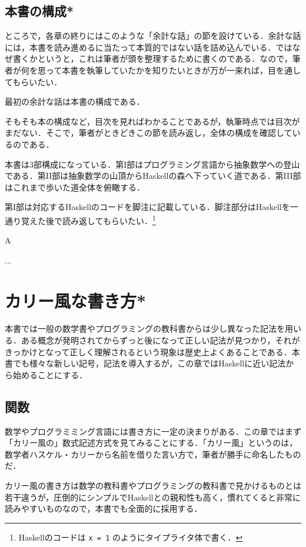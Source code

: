 \documentclass[a4paper,twocolumn]{jsbook}
\newcommand{\programminglanguage}[1]{\textsf{#1}}
\newcommand{\haskell}{\programminglanguage{Haskell}}
\newenvironment{leader}{\begingroup\gt}{\endgroup}
\newenvironment{note}[1]{\begin{boxnote}\begin{center}#1\end{center}}{\end{boxnote}}
\newcommand{\code}[1]{\texttt{#1}}
\begin{document}
\section{本書の構成*}

ところで，各章の終りにはこのような「余計な話」の節を設けている．余計な話には，本書を読み進めるに当たって本質的ではない話を詰め込んでいる．ではなぜ書くかというと，これは筆者が頭を整理するために書くのである．なので，筆者が何を思って本書を執筆していたかを知りたいときが万が一来れば，目を通してもらいたい．

最初の余計な話は本書の構成である．

そもそも本の構成など，目次を見ればわかることであるが，執筆時点では目次がまだない．そこで，筆者がときどきこの節を読み返し，全体の構成を確認しているのである．

本書は3部構成になっている．第I部はプログラミング言語から抽象数学への登山である．第II部は抽象数学の山頂から\haskell の森へ下っていく道である．第III部はこれまで歩いた道全体を俯瞰する．

第I部は対応する\haskell のコードを脚注に記載している．脚注部分は\haskell を一通り覚えた後で読み返してもらいたい．\footnote{\haskell のコードは \code{x = 1} のようにタイプライタ体で書く．}

\begin{note}{A}
...
\end{note}


\chapter{カリー風な書き方*}
\begin{leader}
本書では一般の数学書やプログラミングの教科書からは少し異なった記法を用いる．ある概念が発明されてからずっと後になって正しい記法が見つかり，それがきっかけとなって正しく理解されるという現象は歴史上よくあることである．本書でも様々な新しい記号，記法を導入するが，この章では\haskell に近い記法から始めることにする．
\end{leader}

\section{関数}

数学やプログラミミング言語には書き方に一定の決まりがある．この章ではまず「カリー風の」数式記述方式を見てみることにする．「カリー風」というのは，数学者ハスケル・カリーから名前を借りた言い方で，筆者が勝手に命名したものだ．

カリー風の書き方は数学の教科書やプログラミングの教科書で見かけるものとは若干違うが，圧倒的にシンプルで\haskell との親和性も高く，慣れてくると非常に読みやすいものなので，本書でも全面的に採用する．
\end{document}
